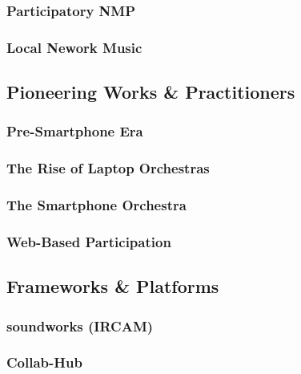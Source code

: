 \documentclass[
  american,
  12pt,
]{article}
\begin{document}
\subsubsection{Participatory NMP}\label{participatory-nmp}

\subsubsection{Local Nework Music}\label{local-nework-music}

\subsection{Pioneering Works \&
Practitioners}\label{pioneering-works-practitioners}

\subsubsection{Pre-Smartphone Era}\label{pre-smartphone-era}

\subsubsection{The Rise of Laptop
Orchestras}\label{the-rise-of-laptop-orchestras}

\subsubsection{The Smartphone Orchestra}\label{the-smartphone-orchestra}

\subsubsection{Web-Based Participation}\label{web-based-participation}

\subsection{Frameworks \& Platforms}\label{frameworks-platforms}

\subsubsection{soundworks (IRCAM)}\label{soundworks-ircam}

\subsubsection{Collab-Hub}\label{collab-hub}
\end{document}
